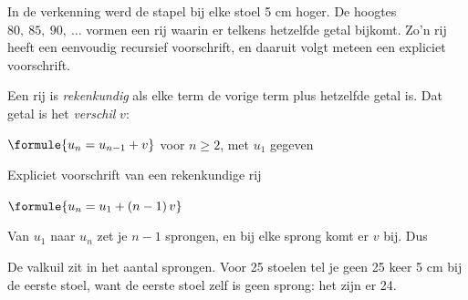 In de verkenning werd de stapel bij elke stoel 5 cm hoger. De hoogtes $80,\ 85,\ 90,\ \ldots$ vormen een rij waarin er telkens hetzelfde getal bijkomt. Zo'n rij heeft een eenvoudig recursief voorschrift, en daaruit volgt meteen een expliciet voorschrift.

\begin{theorie}
Een rij is \emph{rekenkundig} als elke term de vorige term plus hetzelfde getal is. Dat getal is het \emph{verschil} $v$:

\qquad $\formule{u_n = u_{n-1} + v}$ \quad voor $n \geqslant 2$, met $u_1$ gegeven

\begin{stelling}{Expliciet voorschrift van een rekenkundige rij}
\begin{minipage}[t]{.4\linewidth}
\vspace{0pt}
\qquad $\formule{u_n = u_1 + (n-1)\,v}$
\end{minipage}\hfill
\begin{minipage}[t]{.56\linewidth}
\vspace{0pt}
\end{minipage}
\end{stelling}

\begin{bewijs}
Van $u_1$ naar $u_n$ zet je $n - 1$ sprongen, en bij elke sprong komt er $v$ bij. Dus
\end{bewijs}
\end{theorie}

De valkuil zit in het aantal sprongen. Voor 25 stoelen tel je geen 25 keer 5 cm bij de eerste stoel, want de eerste stoel zelf is geen sprong: het zijn er 24.


